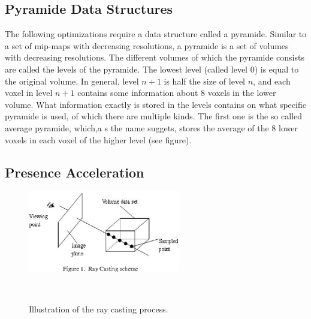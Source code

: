 \subsection{Pyramide Data Structures}
The following optimizations require a data structure called a pyramide. Similar to a set of mip-maps with decreasing resolutions, a pyramide is a set of volumes with decreasing resolutions. The different volumes of which the pyramide consists are called the levels of the pyramide. The lowest level (called level 0) is equal to the original volume. In general, level $n + 1$ is half the size of level $n$, and each voxel in level $n+1$ contains some information about 8 voxels in the lower volume. What information exactly is stored in the levels contains on what specific pyramide is used, of which there are multiple kinds. The first one is the so called average pyramide, which,a s the name suggets, stores the average of the 8 lower voxels in each voxel of the higher level (see figure).
\subsection{Presence Acceleration}


\begin{figure}[htb]
  \centering
  \includegraphics[width=.8\linewidth]{RayCasting1.png}
  \parbox[t]{.9\columnwidth}{\relax }~\cite{Appa2015RayCF}
  \caption{\label{fig:firstExample}
          Illustration of the ray casting process.}
\end{figure}








% 
%       




